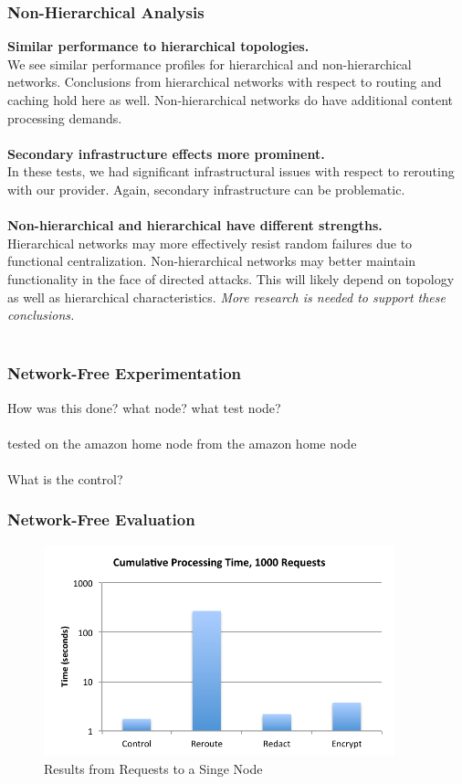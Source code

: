 \documentclass[t,handout]{beamer}
\begin{document}
\begin{frame}
\frametitle{Non-Hierarchical Analysis}
{\bf Similar performance to hierarchical topologies.} \\
{\scriptsize We see similar performance profiles for hierarchical and non-hierarchical networks.  Conclusions from hierarchical networks with respect to routing and caching hold here as well. Non-hierarchical networks do have additional content processing demands.} \\
~\\
{\bf Secondary infrastructure effects more prominent.} \\
{\scriptsize In these tests, we had significant infrastructural issues with respect to rerouting with our provider.  Again, secondary infrastructure can be problematic.  } \\
~\\
{\bf Non-hierarchical and hierarchical have different strengths.} \\
{\scriptsize Hierarchical networks may more effectively resist random failures due to functional centralization. Non-hierarchical networks may better maintain functionality in the face of directed attacks.  This will likely depend on topology as well as hierarchical characteristics.  \textit{More research is needed to support these conclusions.}} \\
~\\
\end{frame}

\begin{frame}
\frametitle{Network-Free Experimentation}
How was this done? what node? what test node?\\
~\\
tested on the amazon home node from the amazon home node \\
~\\
What is the control? \\
\end{frame}

\begin{frame}
\frametitle{Network-Free Evaluation}
\begin{figure}[!t]
\centering
\includegraphics[width=4in]{single-node-results}
\caption{Results from Requests to a Singe Node}
\end{figure}
\end{frame}
\end{document}
